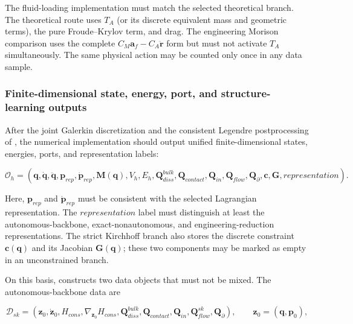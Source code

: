 The fluid-loading implementation must match the selected theoretical branch. The theoretical route uses \(T_{A}\) (or its discrete equivalent mass and geometric terms), the pure Froude--Krylov term, and drag. The engineering Morison comparison uses the complete \(C_{M}\mathbf{a}_{f} - C_{A}\ddot{\mathbf{r}}\) form but must not activate \(T_{A}\) simultaneously. The same physical action may be counted only once in any data sample.

\subsubsection{Finite-dimensional state, energy, port, and structure-learning outputs}\label{sec:galerkin-2-11-2}

After the joint Galerkin discretization and the consistent Legendre postprocessing of , the numerical implementation should output unified finite-dimensional states, energies, ports, and representation labels:

\begin{equation}
\label{eq:galerkin-2-120}
\mathcal{O}_{h} = \left( \mathbf{q},\dot{\mathbf{q}},\ddot{\mathbf{q}},\mathbf{p}_{rep},{\dot{\mathbf{p}}}_{rep},\mathbf{M}\left( \mathbf{q} \right),V_{h},E_{h},\mathbf{Q}_{diss}^{bulk},\mathbf{Q}_{contact},\mathbf{Q}_{in},\mathbf{Q}_{flow},\mathbf{Q}_{\partial},\mathbf{c},\mathbf{G},representation \right).
\end{equation}

Here, \(\mathbf{p}_{rep}\) and \({\dot{\mathbf{p}}}_{rep}\) must be consistent with the selected Lagrangian representation. The \(representation\) label must distinguish at least the autonomous-backbone, exact-nonautonomous, and engineering-reduction representations. The strict Kirchhoff branch also stores the discrete constraint \(\mathbf{c}\left( \mathbf{q} \right)\) and its Jacobian \(\mathbf{G}\left( \mathbf{q} \right)\); these two components may be marked as empty in an unconstrained branch.

On this basis,  constructs two data objects that must not be mixed. The autonomous-backbone data are

\begin{equation}
\label{eq:galerkin-2-121}
\mathcal{D}_{sk} = \left( \mathbf{z}_{0},{\dot{\mathbf{z}}}_{0},H_{cons},\nabla_{\mathbf{z}_{0}}H_{cons},\mathbf{Q}_{diss}^{bulk},\mathbf{Q}_{contact},\mathbf{Q}_{in},\mathbf{Q}_{flow}^{sk},\mathbf{Q}_{\partial} \right),\quad\quad\mathbf{z}_{0} = \left( \mathbf{q},\mathbf{p}_{0} \right),
\end{equation}

